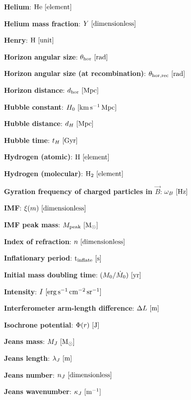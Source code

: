 \documentclass[a4paper,10pt]{article}
\begin{document}
{\noindent}\textbf{Helium}: ${\rm He} ~ [{\rm element}]$

{\noindent}\textbf{Helium mass fraction}: $Y ~ [{\rm dimensionless}]$

{\noindent}\textbf{Henry}: ${\rm H} ~ [{\rm unit}]$

{\noindent}\textbf{Horizon angular size}: $\theta_\mathrm{hor} ~ [{\rm rad}]$

{\noindent}\textbf{Horizon angular size (at recombination)}: $\theta_\mathrm{hor,rec} ~ [{\rm rad}]$

{\noindent}\textbf{Horizon distance}: $d_\mathrm{hor} ~ [{\rm Mpc}]$

{\noindent}\textbf{Hubble constant}: $H_0 ~ [{\rm km\,s^{-1}\,Mpc}]$

{\noindent}\textbf{Hubble distance}: $d_H ~ [{\rm Mpc}]$

{\noindent}\textbf{Hubble time}: $t_H ~ [{\rm Gyr}]$

{\noindent}\textbf{Hydrogen (atomic)}: ${\rm H} ~ [{\rm element}]$

{\noindent}\textbf{Hydrogen (molecular)}: ${\rm H_2} ~ [{\rm element}]$

{\noindent}\textbf{Gyration frequency of charged particles in $\vec{B}$}: $\omega_B ~ [{\rm Hz}]$

{\noindent}\textbf{IMF}: $\xi(m) ~ [{\rm dimensionless}]$

{\noindent}\textbf{IMF peak mass}: $M_\mathrm{peak} ~ [{\rm M_\odot}]$

{\noindent}\textbf{Index of refraction}: $n ~ [{\rm dimensionless}]$

{\noindent}\textbf{Inflationary period}: ${\rm t_\mathrm{inflate}} ~ [{\rm s}]$

{\noindent}\textbf{Initial mass doubling time}: $(M_0/\dot{M}_0) ~ [{\rm yr}]$

{\noindent}\textbf{Intensity}: $I ~ [{\rm erg\,s^{-1}\,cm^{-2}\,sr^{-1}}]$

{\noindent}\textbf{Interferometer arm-length difference}: $\Delta L ~ [{\rm m}]$

{\noindent}\textbf{Isochrone potential}: $\Phi(r) ~ [{\rm J}]$

{\noindent}\textbf{Jeans mass}: $M_J ~ [{\rm M_\odot}]$

{\noindent}\textbf{Jeans length}: $\lambda_J ~ [{\rm m}]$

{\noindent}\textbf{Jeans number}: $n_J ~ [{\rm dimensionless}]$

{\noindent}\textbf{Jeans wavenumber}: $\kappa_J ~ [{\rm m^{-1}}]$
\end{document}
